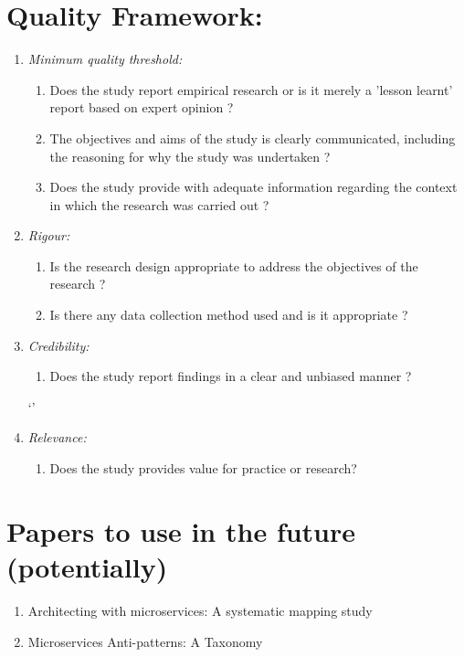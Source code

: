 \documentclass{article}
\theoremstyle{mytheoremstyle}
\theoremstyle{mytheoremstyle}
\theoremstyle{myproblemstyle}
\begin{document}
      \section{Quality Framework:}
      \begin{enumerate}
        \item \emph{Minimum quality threshold:} 
        \begin{enumerate}
            \item Does the study report empirical research or is it merely a 'lesson learnt' report based on expert opinion ?  
            \item The objectives and aims of the study is clearly communicated, including the reasoning for why the study was undertaken ?  
            \item Does the study provide with adequate information regarding the context in which the research was carried out ?  
        \end{enumerate}
        \item \emph{Rigour:}
        \begin{enumerate}
            \item Is the research design appropriate to address the objectives of the research ? 
            \item Is there any data collection method used and is it appropriate ? 
        \end{enumerate}
        \item \emph{Credibility:}
          \begin{enumerate}
            \item Does the study report findings in a clear and unbiased manner ? 
         \end{enumerate}`'
        \item \emph{Relevance:}
        \begin{enumerate}
            \item Does the study provides value for practice or research? 
         \end{enumerate}
    \end{enumerate}

    \section{Papers to use in the future (potentially)}
    \begin{enumerate}
      \item Architecting with microservices: A systematic mapping study
      \item Microservices Anti-patterns: A Taxonomy
    \end{enumerate}
\end{document}
